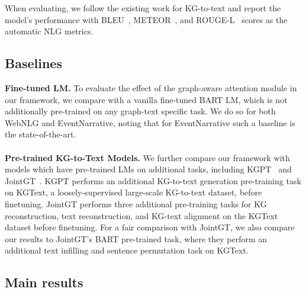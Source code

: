 \documentclass[11pt]{article}
\begin{document}
When evaluating, we follow the existing work for KG-to-text and report the model's performance with BLEU~\cite{papineni2002bleu}, METEOR~\cite{banerjee2005meteor}, and ROUGE-L~\cite{lin2004rouge} scores as the automatic NLG metrics.

\subsection{Baselines}
\textbf{Fine-tuned LM.}
To evaluate the effect of the graph-aware attention module in our framework, we compare with a vanilla fine-tuned BART LM, which is not additionally pre-trained on any graph-text specific task. We do so for both WebNLG and EventNarrative, noting that for EventNarrative such a baseline is the state-of-the-art.
\\\\
\noindent\textbf{Pre-trained KG-to-Text Models.} We further compare our framework with models which have pre-trained LMs on additional tasks, including KGPT~\cite{chen-etal-2020-kgpt} and JointGT~\cite{ke-etal-2021-jointgt}. KGPT performs an additional KG-to-text generation pre-training task on KGText, a loosely-supervised large-scale KG-to-text dataset, before finetuning. JointGT performs three additional pre-training tasks for KG reconstruction, text reconstruction, and KG-text alignment on the KGText dataset before finetuning. For a fair comparison with JointGT, we also compare our results to JointGT's BART pre-trained task, where they perform an additional text infilling and sentence permutation task on KGText.


\subsection{Main results}



\begin{table}[]
\caption{\label{tab:Main-Event} Performance comparison on EventNarrative. We compare to the pretrained baselines, T5 and BART, reprinted from~\cite{colas2021eventnarrative}, and adapt JointGT~\cite{ke-etal-2021-jointgt} to the dataset.}
\end{table}
\end{document}
